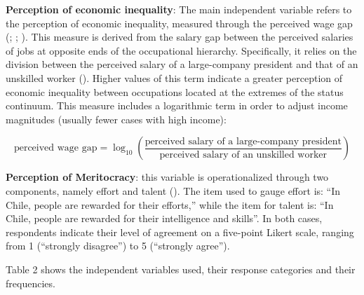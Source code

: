 \documentclass[
  12pt,
]{article}
\begin{document}
\textbf{Perception of economic inequality}: The main independent
variable refers to the perception of economic inequality, measured
through the perceived wage gap
(;
;
). This measure is derived
from the salary gap between the perceived salaries of jobs at opposite
ends of the occupational hierarchy. Specifically, it relies on the
division between the perceived salary of a large-company president and
that of an unskilled worker (). Higher values of this term indicate a greater perception of
economic inequality between occupations located at the extremes of the
status continuum. This measure includes a logarithmic term in order to
adjust income magnitudes (usually fewer cases with high income):

\[
\text{perceived wage gap} = \log_{10}\left(\frac{\text{perceived salary of a large-company president}}{\text{perceived salary of an unskilled worker}}\right)
\]

\textbf{Perception of Meritocracy}: this variable is operationalized
through two components, namely effort and talent
(). The item used to gauge
effort is: ``In Chile, people are rewarded for their efforts,'' while
the item for talent is: ``In Chile, people are rewarded for their
intelligence and skills''. In both cases, respondents indicate their
level of agreement on a five-point Likert scale, ranging from 1
(``strongly disagree'') to 5 (``strongly agree'').

Table 2 shows the independent variables used, their response categories
and their frequencies.
\end{document}
